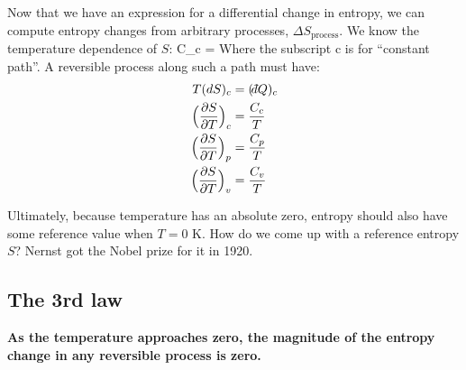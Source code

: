 \documentclass[12pt]{article}
\def\dbar{{\mathchar'26\mkern-12mu d}}
\begin{document}

Now that we have an expression for a differential change in entropy, we can compute  entropy changes from arbitrary processes, $\Delta S_{\text{process}}$.  We know the temperature dependence of $S$:
\beq C_c = \frac{(\dbar Q)_c}{dT} \ceq
Where the subscript c is for ``constant path''. A reversible process along such a path must have:
\begin{align*}
T(dS)_c &= (\dbar Q)_c\\
\Big(\frac{\partial S}{\partial T}\Big)_c &= \frac{C_c}{T} \\
\Big(\frac{\partial S}{\partial T}\Big)_p &= \frac{C_p}{T}\\
\Big(\frac{\partial S}{\partial T}\Big)_v &= \frac{C_v}{T}\\
\end{align*}

Ultimately, because temperature has an absolute zero, entropy should also have some reference value when $T=0$ K.  How do we come up with a reference entropy $S$?  Nernst got the Nobel prize for it in 1920.

\subsection{The 3rd law}
\textbf{As the temperature approaches zero, the magnitude of the entropy change in any reversible process is zero.}
\end{document}
